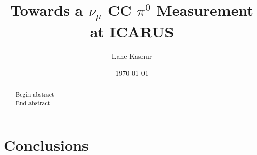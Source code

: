 \documentclass[]{article}
\title{Towards a $\nu_{\mu}$ CC $\pi^{0}$ Measurement at ICARUS}
\author{Lane Kashur}
\date{\today}
\begin{document}
\maketitle

\begin{abstract}
Begin abstract \vspace{1cm} \\

End abstract
\end{abstract}

\tableofcontents







\section{Conclusions}

%

\printbibliography
\end{document}

